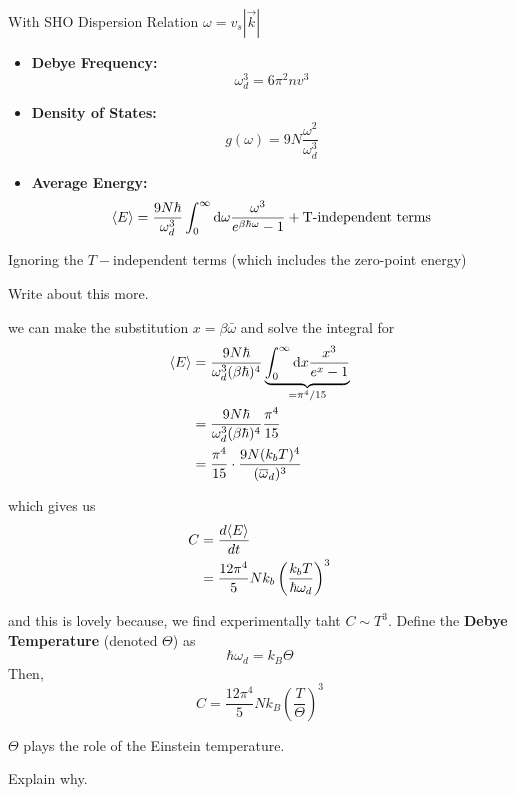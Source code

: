 \documentclass[11pt]{article}
\begin{document}
With SHO Dispersion Relation $\omega = v_s |\vec{k}|$
\begin{itemize}
  \item \textbf{Debye Frequency:}
  \[ \omega_d^3 = 6\pi^2 n v^3 \]
  \item \textbf{Density of States:}
  \[ g(\omega) = 9N \frac{\omega^2}{\omega_d^3} \]
  \item \textbf{Average Energy:}
  \[ \langle E \rangle = \frac{9N\hbar}{\omega_d^3} \int_0^{\infty} \mathrm{d}\omega \frac{\omega^3}{e^{\beta \hbar \omega} - 1} + \text{T-independent terms} \]
\end{itemize}

Ignoring the $T-$independent terms (which includes the zero-point energy) \begin{note}
  {Write about this more.}
\end{note} we can make the substitution $x = \beta \bar \omega$ and solve the integral for 
\begin{align*}
  \langle E \rangle &= \frac{9N\hbar}{\omega_d^3 (\beta \hbar)^4} \underbrace{\int_{0}^{\infty} \mathrm{d}x \frac{x^3}{e^x - 1}}_{=\pi^4/15} \\
  &= \frac{9N\hbar}{\omega_d^3 (\beta \hbar)^4} \frac{\pi^4}{15} \\
  &= \frac{\pi^4}{15} \cdot \frac{9N (k_bT)^4}{(\overline{\omega}_d)^3}
\end{align*}

which gives us 
\begin{align*}
  C &= \frac{d\langle E \rangle}{dt} \\
  &= \frac{12 \pi^4}{5} N k_b \left(\frac{k_bT}{\hbar \omega_d}\right)^3
\end{align*}

and this is lovely because, we find experimentally taht $C \sim T^3$. Define the \textbf{Debye Temperature} (denoted $\Theta$) as \[ \hbar \omega_d = k_B \Theta  \] Then, \[ C = \frac{12\pi^4}{5} Nk_B \left( \frac{T}{\Theta} \right)^3 \]


\begin{bluebox}
  $\Theta$ plays the role of the Einstein temperature. \begin{note}
    {Explain why.}
  \end{note}
\end{bluebox}

\end{document}

